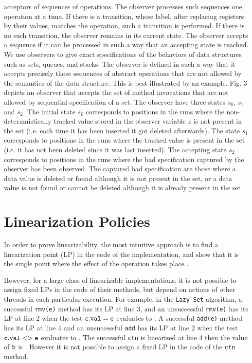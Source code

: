 acceptors of sequences of operations. The observer processes such sequences
one operation at a time. If there is a transition, whose label, after replacing registers by their values, matches the operation, such a transition is performed. If there is no such transition,
the observer remains in its current state. The observer accepts a sequence if it can be
processed in such a way that an accepting state is reached. We use observers to give exact specifications of the behaviors of data structures such as sets, queues, and stacks. The observer is defined in such a way that it accepts
precisely those sequences of abstract operations that are not allowed by the semantics of
the data structure. This is best illustrated by an example. Fig. 3 depicts an observer that
accepts the set of method invocations that are not allowed by sequential specification of a set. The observer have three states $s_0$, $s_1$ and $s_2$. The initial state $s_0$ corresponds to positions in the runs where the non-determnistically tracked value
stored in the observer variable $z$ is not present in the set (i.e.
each time it has been inserted it got deleted afterwards). The
state $s_1$ corresponds to positions in the runs where the tracked
value is present in the set (i.e. it has not been deleted since it
was last inserted). The accepting state $s_2$ corresponds to positions
in the runs where the bad specification captured by the observer has been observed. The captured bad specification are those where
a data value is deleted or found although it is not present in the set, or a data value is not found or cannot be deleted although it is already present in the set

\section*{Linearization Policies}
\label{controllers:subsection}
In order to prove linearizability, the most intuitive approach is to find a linearization point (LP) in the code of the implementation, and show that it is the single point where the effect of the operation takes place \cite{AHHR:integrated:rep,BLMRS:cav08,Vafeiadis}.

However, for a large class of linearizable implementations,
it is not possible to assign fixed LPs in the code of their methods, 
but depend on actions of other threads in each particular execution. For example, 
in the {\tt Lazy Set} algorithm, a successful {\tt rmv(e)} method has its LP at line 3, and an unsuccessful {\tt rmv(e)} has its LP at line 2 when the test $\tt c.val = e$ evaluates to \false. A successful {\tt add(e)} method has its LP at line 4 and an unsuccessful {\tt add} has its LP at line 2 when the test $\tt c.val <> e$ evaluates to \false\;. The successful {\tt ctn} is linearized at line 4 then the value of $\tt b$ is \true. 
However it is not possible to assign a fixed LP in the code of the {\tt ctn} method.


